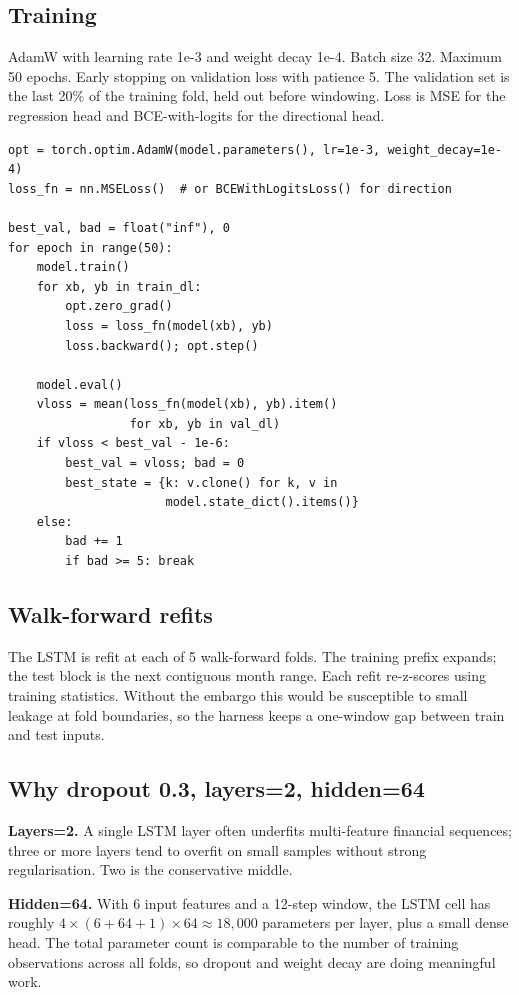 \documentclass[11pt,letterpaper]{article}
\begin{document}
\subsection{Training}

AdamW with learning rate 1e-3 and weight decay 1e-4. Batch size 32. Maximum 50 epochs. Early stopping on validation loss with patience 5. The validation set is the last 20\% of the training fold, held out before windowing. Loss is MSE for the regression head and BCE-with-logits for the directional head.

\begin{lstlisting}
opt = torch.optim.AdamW(model.parameters(), lr=1e-3, weight_decay=1e-4)
loss_fn = nn.MSELoss()  # or BCEWithLogitsLoss() for direction

best_val, bad = float("inf"), 0
for epoch in range(50):
    model.train()
    for xb, yb in train_dl:
        opt.zero_grad()
        loss = loss_fn(model(xb), yb)
        loss.backward(); opt.step()

    model.eval()
    vloss = mean(loss_fn(model(xb), yb).item()
                 for xb, yb in val_dl)
    if vloss < best_val - 1e-6:
        best_val = vloss; bad = 0
        best_state = {k: v.clone() for k, v in
                      model.state_dict().items()}
    else:
        bad += 1
        if bad >= 5: break
\end{lstlisting}

\subsection{Walk-forward refits}

The LSTM is refit at each of 5 walk-forward folds. The training prefix expands; the test block is the next contiguous month range. Each refit re-z-scores using training statistics. Without the embargo this would be susceptible to small leakage at fold boundaries, so the harness keeps a one-window gap between train and test inputs.

\subsection{Why dropout 0.3, layers=2, hidden=64}

\textbf{Layers=2.} A single LSTM layer often underfits multi-feature financial sequences; three or more layers tend to overfit on small samples without strong regularisation. Two is the conservative middle.

\textbf{Hidden=64.} With 6 input features and a 12-step window, the LSTM cell has roughly $4 \times (6 + 64 + 1) \times 64 \approx 18{,}000$ parameters per layer, plus a small dense head. The total parameter count is comparable to the number of training observations across all folds, so dropout and weight decay are doing meaningful work.
\end{document}
